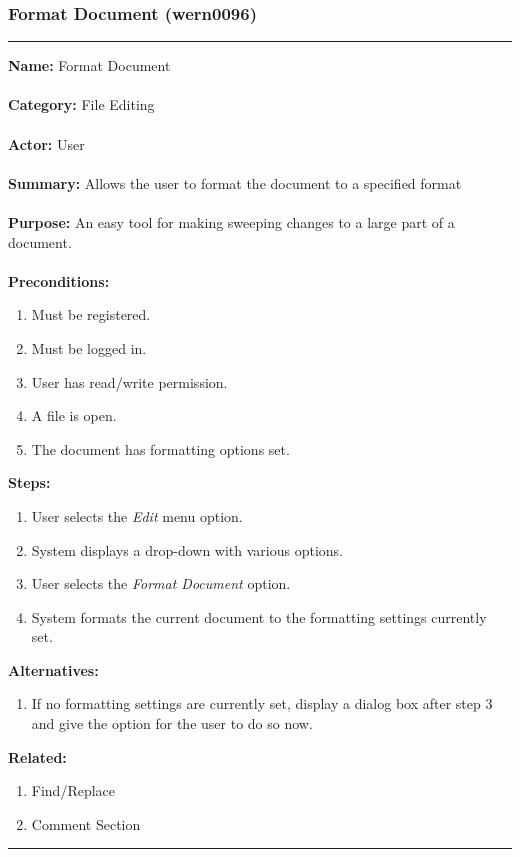 \documentclass[11pt]{report}
\begin{document}
\subsubsection{Format Document (wern0096)}
\vspace{2pt}
\hrule
\vspace{8pt}
	\noindent\textbf{Name:} Format Document \\ \\
	\textbf{Category:} File Editing \\ \\
	\textbf{Actor:} User \\ \\
	\textbf{Summary:} Allows the user to format the document to a specified format \\ \\
	\textbf{Purpose:} An easy tool for making sweeping changes to a large part of a document. \\ \\
	\textbf{Preconditions:} 
	\begin{enumerate}
		\item Must be registered.
		\item Must be logged in.
		\item User has read/write permission.
		\item A file is open.
		\item The document has formatting options set.
	\end{enumerate}
	\textbf{Steps:}
	\begin{enumerate}
		\item User selects the \textit{Edit} menu option.
		\item System displays a drop-down with various options.
		\item User selects the \textit{Format Document} option.
		\item System formats the current document to the formatting settings currently set.
	\end{enumerate}
	\textbf{Alternatives:}
	\begin{enumerate}
		\item If no formatting settings are currently set, display a dialog box after step 3 and give the option for the user to do so now.
	\end{enumerate}
	\textbf{Related:}
	\begin{enumerate}
		\item Find/Replace
		\item Comment Section
	\end{enumerate}
\vspace{8pt}
\hrule
\newpage
\end{document}
